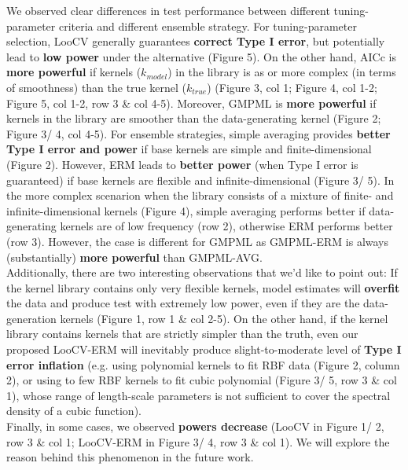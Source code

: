 \documentclass[11pt]{article}
\begin{document}
We observed clear differences in test performance between different tuning-parameter criteria and different ensemble strategy. For tuning-parameter selection, LooCV generally guarantees \textbf{correct Type I error}, but potentially lead to \textbf{low power} under the alternative (Figure 5). On the other hand, AICc is \textbf{more powerful} if kernels ($k_{model}$) in the library is as or more complex (in terms of smoothness) than the true kernel ($k_{true}$) (Figure 3, col 1; Figure 4, col 1-2; Figure 5, col 1-2, row 3 \& col 4-5). Moreover, GMPML is \textbf{more powerful} if kernels in the library are smoother than the data-generating kernel (Figure 2; Figure 3/ 4, col 4-5). For ensemble strategies, simple averaging provides \textbf{better Type I error and power} if base kernels are simple and finite-dimensional (Figure 2). However, ERM leads to \textbf{better power} (when Type I error is guaranteed) if base kernels are flexible and infinite-dimensional (Figure 3/ 5). In the more complex scenarion when the library consists of a mixture of finite- and infinite-dimensional kernels (Figure 4), simple averaging performs better if data-generating kernels are of low frequency (row 2), otherwise ERM performs better (row 3). However, the case is different for GMPML as GMPML-ERM is always (substantially) \textbf{more powerful} than GMPML-AVG. \\

Additionally, there are two interesting observations that we'd like to point out: 
If the kernel library contains only very flexible kernels, model estimates will \textbf{overfit} the data and produce test with extremely low power, even if they are the data-generation kernels (Figure 1, row 1 \& col 2-5). On the other hand, if the kernel library contains kernels that are strictly simpler than the truth, even our proposed LooCV-ERM will inevitably produce slight-to-moderate level of  \textbf{Type I error inflation} (e.g. using polynomial kernels to fit RBF data (Figure 2, column 2), or using to few RBF kernels to fit cubic polynomial (Figure 3/ 5, row 3 \& col 1), whose range of length-scale parameters is not sufficient to cover the  spectral density of a cubic function).\\

Finally, in some cases, we observed \textbf{powers decrease} (LooCV in Figure 1/ 2, row 3 \& col 1; LooCV-ERM in Figure 3/ 4, row 3 \& col 1). We will explore the reason behind this phenomenon in the future work.
\end{document}

